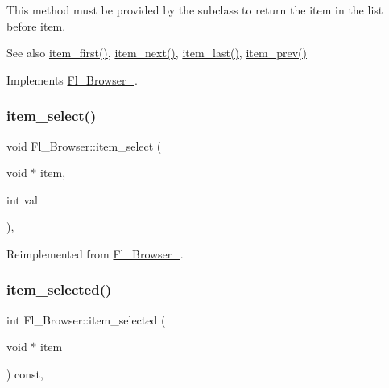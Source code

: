 This method must be provided by the subclass to return the item in the list before {\ttfamily item}. \begin{DoxySeeAlso}{See also}
\hyperlink{class_fl___browser_a7822c6d04744af8f9ffa7a1e0c46955c}{item\+\_\+first()}, \hyperlink{class_fl___browser_aca0d9393c07552ce4ee75a9a10dbe93e}{item\+\_\+next()}, \hyperlink{class_fl___browser_a5de7360f3e39ad20c3bf552893a92626}{item\+\_\+last()}, \hyperlink{class_fl___browser_a0fbf4d057bc1b7afcdd872b78ee8526b}{item\+\_\+prev()} 
\end{DoxySeeAlso}


Implements \hyperlink{class_fl___browser___afeb24ca0dbd8e4685fa18382512c94d3}{Fl\+\_\+\+Browser\+\_\+}.

\mbox{\label{class_fl___browser_afe09fb2afd71d7504d23742d11327be1}} 
\subsubsection{\texorpdfstring{item\+\_\+select()}{item\_select()}}
{\footnotesize\ttfamily void Fl\+\_\+\+Browser\+::item\+\_\+select (\begin{DoxyParamCaption}\item[{void $\ast$}]{item,  }\item[{int}]{val }\end{DoxyParamCaption})\hspace{0.3cm}{\ttfamily [protected]}, {\ttfamily [virtual]}}



Reimplemented from \hyperlink{class_fl___browser___a81b34bf7d536207d3b049924ef491f3b}{Fl\+\_\+\+Browser\+\_\+}.

\mbox{\label{class_fl___browser_af407fce6bdc3c2892aad6a38ef647f9e}} 
\subsubsection{\texorpdfstring{item\+\_\+selected()}{item\_selected()}}
{\footnotesize\ttfamily int Fl\+\_\+\+Browser\+::item\+\_\+selected (\begin{DoxyParamCaption}\item[{void $\ast$}]{item }\end{DoxyParamCaption}) const\hspace{0.3cm}{\ttfamily [protected]}, {\ttfamily [virtual]}}




